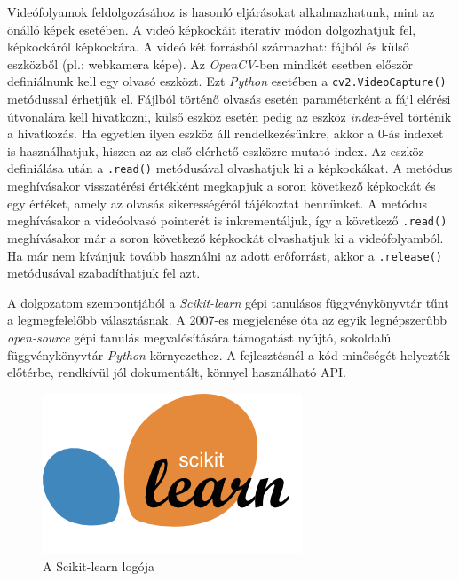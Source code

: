 Videófolyamok feldolgozásához is hasonló eljárásokat alkalmazhatunk, mint az önálló képek esetében. A videó képkockáit iteratív módon dolgozhatjuk fel, képkockáról képkockára. A videó két forrásból származhat: fájból és külső eszközből (pl.: webkamera képe). Az \textit{OpenCV}-ben mindkét esetben először definiálnunk kell egy olvasó eszközt. Ezt \textit{Python} esetében a \texttt{cv2.VideoCapture()} metódussal érhetjük el. Fájlból történő olvasás esetén paraméterként a fájl elérési útvonalára kell hivatkozni, külső eszköz esetén pedig az eszköz \textit{index}-ével történik a hivatkozás. Ha egyetlen ilyen eszköz áll rendelkezésünkre, akkor a 0-ás indexet is használhatjuk, hiszen az az első elérhető eszközre mutató index.
Az eszköz definiálása után a \texttt{.read()} metódusával olvashatjuk ki a képkockákat. A metódus meghívásakor visszatérési értékként megkapjuk a soron következő képkockát és egy értéket, amely az olvasás sikerességéről tájékoztat bennünket. A metódus meghívásakor a videóolvasó pointerét is inkrementáljuk, így a következő \texttt{.read()} meghívásakor már a soron következő képkockát olvashatjuk ki a videófolyamból. Ha már nem kívánjuk tovább használni az adott erőforrást, akkor a \texttt{.release()} metódusával szabadíthatjuk fel azt.


A dolgozatom szempontjából a \textit{Scikit-learn} gépi tanulásos függvénykönyvtár tűnt a legmegfelelőbb választásnak. A 2007-es megjelenése óta az egyik legnépszerűbb \textit{open-source} gépi tanulás megvalósítására támogatást nyújtó, sokoldalú függvénykönyvtár \textit{Python} környezethez. A fejlesztésnél a kód minőségét helyezték előtérbe, rendkívül jól dokumentált, könnyel használható API.

\begin{figure}[h]
\centering
\includegraphics[width=4.76truecm, height=2.96truecm]{images/scikit-learn-logo.png}
\caption{A Scikit-learn logója}
\label{fig:scikit}
\end{figure}

